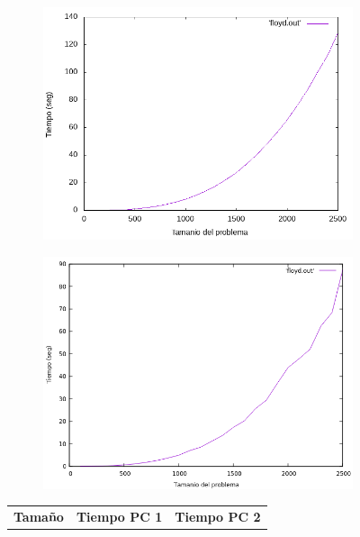 \documentclass[12pt,spanish]{article}
\begin{document}
\begin{figure}[H]
\centering
\begin{subfigure}[b]{0.45\textwidth}
\includegraphics[scale=0.45]{empirica_floyd.png}
\caption{}
\end{subfigure}
\quad
\begin{subfigure}[b]{0.45\textwidth}
\includegraphics[scale=0.45]{empirica_floyd_2.png}
\caption{}
\end{subfigure}
\newline
\newline
\begin{tabular}{|c|c|c|}
\hline
\textbf{Tamaño} & \textbf{Tiempo PC 1} & \textbf{Tiempo PC 2} \\

\end{tabular}
\end{figure}
\end{document}
